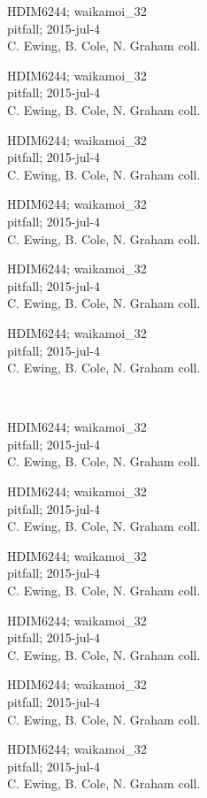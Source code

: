 \documentclass[2pt]{extarticle}
\begin{document}
\noindent
\parbox{0.16\textwidth}{\tiny \raggedright \rule[-0.3\baselineskip]{0pt}{10pt}HDIM6244; waikamoi\_32\\ pitfall; 2015-jul-4\\ C. Ewing, B. Cole, N. Graham coll.}
\parbox{0.16\textwidth}{\tiny \raggedright \rule[-0.3\baselineskip]{0pt}{10pt}HDIM6244; waikamoi\_32\\ pitfall; 2015-jul-4\\ C. Ewing, B. Cole, N. Graham coll.}
\parbox{0.16\textwidth}{\tiny \raggedright \rule[-0.3\baselineskip]{0pt}{10pt}HDIM6244; waikamoi\_32\\ pitfall; 2015-jul-4\\ C. Ewing, B. Cole, N. Graham coll.}
\parbox{0.16\textwidth}{\tiny \raggedright \rule[-0.3\baselineskip]{0pt}{10pt}HDIM6244; waikamoi\_32\\ pitfall; 2015-jul-4\\ C. Ewing, B. Cole, N. Graham coll.}
\parbox{0.16\textwidth}{\tiny \raggedright \rule[-0.3\baselineskip]{0pt}{10pt}HDIM6244; waikamoi\_32\\ pitfall; 2015-jul-4\\ C. Ewing, B. Cole, N. Graham coll.}
\parbox{0.16\textwidth}{\tiny \raggedright \rule[-0.3\baselineskip]{0pt}{10pt}HDIM6244; waikamoi\_32\\ pitfall; 2015-jul-4\\ C. Ewing, B. Cole, N. Graham coll.} \\ 
\vspace{0.001in} 

\noindent
\parbox{0.16\textwidth}{\tiny \raggedright \rule[-0.3\baselineskip]{0pt}{10pt}HDIM6244; waikamoi\_32\\ pitfall; 2015-jul-4\\ C. Ewing, B. Cole, N. Graham coll.}
\parbox{0.16\textwidth}{\tiny \raggedright \rule[-0.3\baselineskip]{0pt}{10pt}HDIM6244; waikamoi\_32\\ pitfall; 2015-jul-4\\ C. Ewing, B. Cole, N. Graham coll.}
\parbox{0.16\textwidth}{\tiny \raggedright \rule[-0.3\baselineskip]{0pt}{10pt}HDIM6244; waikamoi\_32\\ pitfall; 2015-jul-4\\ C. Ewing, B. Cole, N. Graham coll.}
\parbox{0.16\textwidth}{\tiny \raggedright \rule[-0.3\baselineskip]{0pt}{10pt}HDIM6244; waikamoi\_32\\ pitfall; 2015-jul-4\\ C. Ewing, B. Cole, N. Graham coll.}
\parbox{0.16\textwidth}{\tiny \raggedright \rule[-0.3\baselineskip]{0pt}{10pt}HDIM6244; waikamoi\_32\\ pitfall; 2015-jul-4\\ C. Ewing, B. Cole, N. Graham coll.}
\parbox{0.16\textwidth}{\tiny \raggedright \rule[-0.3\baselineskip]{0pt}{10pt}HDIM6244; waikamoi\_32\\ pitfall; 2015-jul-4\\ C. Ewing, B. Cole, N. Graham coll.}
\end{document}
